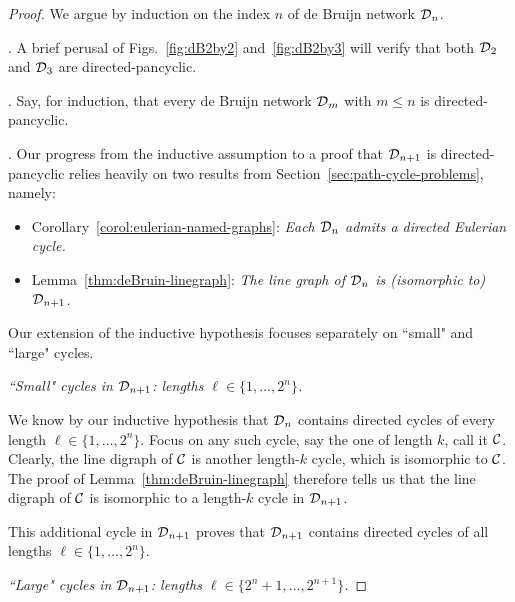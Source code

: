 \begin{proof}
We argue by induction on the index $n$ of de Bruijn network $\mbox{$\cal D$}_n$.

\medskip

.  
 A brief perusal of Figs.~\ref{fig:dB2by2} and~\ref{fig:dB2by3} will verify that both $\mbox{$\cal D$}_2$ and $\mbox{$\cal D$}_3$ are directed-pancyclic.

\medskip

.
Say, for induction, that every de Bruijn network $\mbox{$\cal D$}_m$ with $m \leq n$ is directed-pancyclic.

\smallskip

.
Our progress from the inductive assumption to a proof that $\mbox{$\cal D$}_{n+1}$ is directed-pancyclic relies heavily on two results from Section~\ref{sec:path-cycle-problems}, namely:
\begin{itemize}
\item
Corollary~\ref{corol:eulerian-named-graphs}: {\em Each $\mbox{$\cal D$}_n$ admits a directed Eulerian cycle.}
\medskip\item
Lemma~\ref{thm:deBruin-linegraph}: {\em The line graph of $\mbox{$\cal D$}_n$ is (isomorphic to) $\mbox{$\cal D$}_{n+1}$.}
\end{itemize}

\smallskip

Our extension of the inductive hypothesis focuses separately on ``small"  and ``large" cycles.

\medskip

  {\em ``Small" cycles in $\mbox{$\cal D$}_{n+1}$: lengths $\ell \in \{1, \ldots, 2^n\}$.}

\smallskip

\noindent
We know by our inductive hypothesis that $\mbox{$\cal D$}_n$ contains directed cycles of every length
$\ell \in \{1, \ldots, 2^n\}$.  Focus on any such cycle, say the one of length $k$, call it $\mbox{$\cal C$}$.  Clearly, the line digraph of $\mbox{$\cal C$}$ is another length-$k$ cycle, which is isomorphic to $\mbox{$\cal C$}$.  The proof of Lemma~\ref{thm:deBruin-linegraph} therefore tells us that the line digraph of $\mbox{$\cal C$}$ is
isomorphic to a length-$k$ cycle in $\mbox{$\cal D$}_{n+1}$.

\smallskip

This additional cycle in $\mbox{$\cal D$}_{n+1}$ proves that $\mbox{$\cal D$}_{n+1}$ contains directed cycles of all lengths $\ell \in \{1, \ldots, 2^n\}$.

\medskip

 {\em ``Large" cycles in $\mbox{$\cal D$}_{n+1}$: lengths $\ell \in \{2^n+ 1, \ldots, 2^{n+1}\}$.}


\end{proof}
